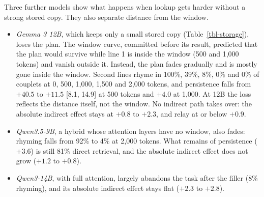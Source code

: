 \documentclass[
]{article}
\providecommand{\tightlist}{%
  \setlength{\itemsep}{0pt}\setlength{\parskip}{0pt}}
\begin{document}
\begin{table}

\caption{\label{tbl-distance}Indirect paths at a distance, Gemma 3 27B
(chat prompt; 50 couplets per distance; 95\% intervals). Shares are of
persistence at the same distance. The generated-text block is the cue
plus all of line 2; it is not split into late lookup and relay.}


\end{table}%

Three further models show what happens when lookup gets harder without a
strong stored copy. They also separate distance from the window.

\begin{itemize}
\tightlist
\item
  \emph{Gemma 3 12B}, which keeps only a small stored copy
  (Table~\ref{tbl-storage}), loses the plan. The window curve, committed
  before its result, predicted that the plan would survive while line 1
  is inside the window (500 and 1,000 tokens) and vanish outside it.
  Instead, the plan fades gradually and is mostly gone inside the
  window. Second lines rhyme in 100\%, 39\%, 8\%, 0\% and 0\% of
  couplets at 0, 500, 1,000, 1,500 and 2,000 tokens, and persistence
  falls from \(+40.5\) to \(+11.5\) {[}8.1, 14.9{]} at 500 tokens and
  \(+4.0\) at 1,000. At 12B the loss reflects the distance itself, not
  the window. No indirect path takes over: the absolute indirect effect
  stays at \(+0.8\) to \(+2.3\), and relay at or below \(+0.9\).
\item
  \emph{Qwen3.5-9B}, a hybrid whose attention layers have no window,
  also fades: rhyming falls from 92\% to 4\% at 2,000 tokens. What
  remains of persistence (\(+3.6\)) is still 81\% direct retrieval, and
  the absolute indirect effect does not grow (\(+1.2\) to \(+0.8\)).
\item
  \emph{Qwen3-14B}, with full attention, largely abandons the task after
  the filler (8\% rhyming), and its absolute indirect effect stays flat
  (\(+2.3\) to \(+2.8\)).
\end{itemize}
\end{document}
